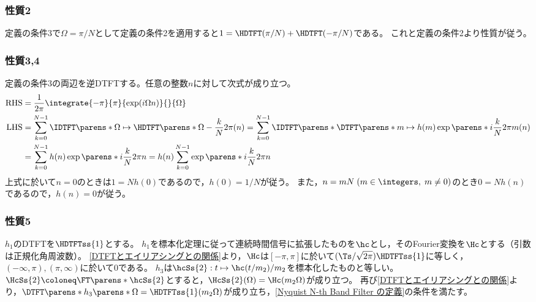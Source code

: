         \subsubsection{性質2}
            定義の条件3で$\Omega=\pi/N$として定義の条件2を適用すると$1 = \HDTFT(\pi/N) + \HDTFT(-\pi/N)$である。
            これと定義の条件2より性質が従う。
        \subsubsection{性質3,4}
            定義の条件3の両辺を逆DTFTする。任意の整数$n$に対して次式が成り立つ。
            \begin{align*}
                \text{RHS} &= \frac{1}{2\pi}\integrate{-\pi}{\pi}{\exp(i\Omega n)}{}{\Omega} \\
                \text{LHS} &= \sum_{k=0}^{N-1} \IDTFT\parens*{\Omega\mapsto\HDTFT\parens*{\Omega-\frac{k}{N}2\pi}}(n) = \sum_{k=0}^{N-1} \IDTFT\parens*{\DTFT\parens*{m\mapsto h(m)\exp\parens*{i\frac{k}{N}2\pi m}}}(n) \\
                &= \sum_{k=0}^{N-1}h(n)\exp\parens*{i\frac{k}{N}2\pi n} = h(n)\sum_{k=0}^{N-1}\exp\parens*{i\frac{k}{N}2\pi n}
            \end{align*}
            上式に於いて$n=0$のときは$1 = Nh(0)$であるので，$h(0)=1/N$が従う。
            また，$n=mN\;(m\in\integers,\;m\neq 0)$のとき$0 = Nh(n)$であるので，$h(n)=0$が従う。
        \subsubsection{性質5}
            $h_1$のDTFTを$\HDTFTss{1}$とする。
            $h_1$を標本化定理に従って連続時間信号に拡張したものを$\hc$とし，そのFourier変換を$\Hc$とする（引数は正規化角周波数）。
            \ref{DTFTとエイリアシングとの関係}より，$\Hc$は$[-\pi,\pi]$に於いて$(\Ts/\sqrt{2\pi})\HDTFTss{1}$に等しく，$(-\infty,\pi),(\pi,\infty)$に於いて0である。
            $h_3$は$\hcSs{2}:t\mapsto\hc(t/m_2)/m_2$を標本化したものと等しい。
            $\HcSs{2}\coloneq\FT\parens*{\hcSs{2}}$とすると，$\HcSs{2}(\Omega) = \Hc(m_2\Omega)$が成り立つ。
            再び\ref{DTFTとエイリアシングとの関係}より，$\DTFT\parens*{h_3}\parens*{\Omega} = \HDTFTss{1}(m_2\Omega)$が成り立ち，\ref{Nyquist N-th Band Filter の定義}の条件を満たす。